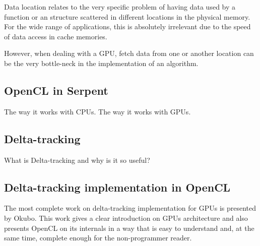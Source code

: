 \documentclass[twoside,a4paper,12pt,english]{anstrans}
\renewcommand{\vec}[1]{\bm{#1}} %
\newcommand{\vd}{\bm{\cdot}} %
\newcommand{\grad}{\vec{\nabla}} %
\newcommand{\ud}{\mathop{}\!\mathrm{d}} %
\begin{document}
Data location relates to the very specific problem of having data used by a function or an
structure scattered in different locations in the physical memory. For the wide range of
applications, this is absolutely irrelevant due to the speed of data access in cache memories.

However, when dealing with a GPU, fetch data from one or another location can be the very
bottle-neck in the implementation of an algorithm.

\subsection{OpenCL in Serpent}

The way it works with CPUs.
The way it works with GPUs.

\subsection{Delta-tracking}

What is Delta-tracking and why is it so useful?

\subsection{Delta-tracking implementation in OpenCL}

The most complete work on delta-tracking implementation for GPUs is presented
by Okubo\cite{Okubo2016}. This work gives a clear introduction on GPUs architecture
and also presents OpenCL on its internals in a way that is easy to understand and,
at the same time, complete enough for the non-programmer reader.

\iffalse
\begin{subequations} \label{eqs:fullTransport}
\begin{multline} \label{eq:fullTransportVol}
  \vec{\Omega}\vd \grad \psi(\vec{x}, \vec{\Omega})
  + \sigma(\vec{x}) \psi (\vec{x}, \vec{\Omega})
\\ =
  \frac{\sigma_s(\vec{x})}{4\pi} \int_{4\pi} \psi(\vec{x},\vec{\Omega}')
  \ud\Omega' + \frac{q(\vec{x})}{4\pi}
  \equiv \frac{1}{4\pi} Q(\vec{x}) \,,
\end{multline}
inside $\vec{x} \in V$, $\vec{\Omega} \in 4\pi$, with an incident boundary
condition
\begin{equation} \label{eq:fullTransportBndy}
  \psi(\vec{x}, \vec{\Omega}) = \psi^b(\vec{x}, \vec{\Omega}) \,,
 \quad \vec{x} \in \partial V, \ \vec{\Omega} \vd \vec{n} < 0\,.
\end{equation}
\end{subequations}
\fi
\end{document}
